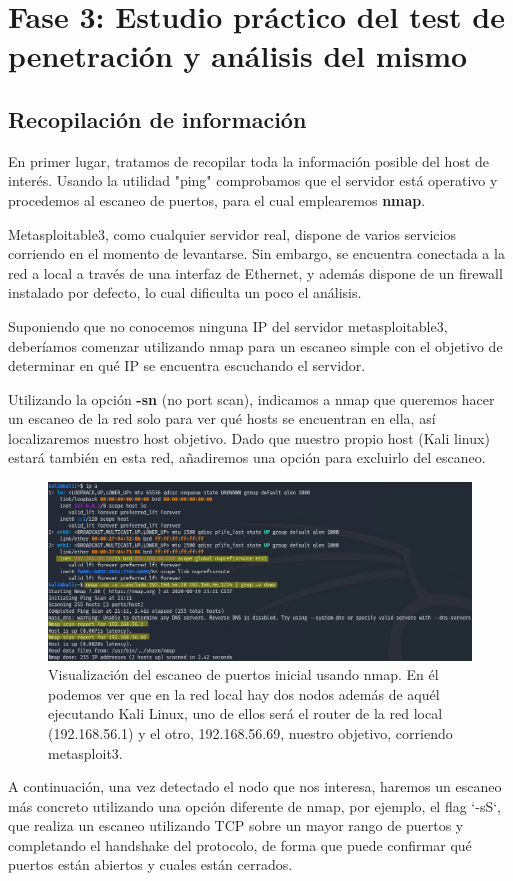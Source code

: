 \chapter{Fase 3: Estudio práctico del test de penetración y análisis del mismo}

\section{Recopilación de información}

En primer lugar, tratamos de recopilar toda la información posible del host de interés. Usando la utilidad "ping" comprobamos que el servidor está operativo y procedemos al escaneo de puertos, para el cual emplearemos \textbf{nmap}.

Metasploitable3, como cualquier servidor real, dispone de varios servicios corriendo en el momento de levantarse. Sin embargo, se encuentra conectada a la red a local a través de una interfaz de Ethernet, y además dispone de un firewall instalado por defecto, lo cual dificulta un poco el análisis.

Suponiendo que no conocemos ninguna IP del servidor metasploitable3, deberíamos comenzar utilizando nmap para un escaneo simple con el objetivo de determinar en qué IP se encuentra escuchando el servidor.

Utilizando la opción \textbf{-sn} (no port scan), indicamos a nmap que queremos hacer un escaneo de la red solo para ver qué hosts se encuentran en ella, así localizaremos nuestro host objetivo. Dado que nuestro propio host (Kali linux) estará también en esta red, añadiremos una opción para excluirlo del escaneo. 

\begin{figure}[hbt]
  \centering
      \includegraphics[width=\textwidth]{imagenes/nmap_sn.png}
  \caption{Visualización del escaneo de puertos inicial usando nmap. En él podemos ver que en la red local hay dos nodos además de aquél ejecutando Kali Linux, uno de ellos será el router de la red local (192.168.56.1) y el otro, 192.168.56.69, nuestro objetivo, corriendo metasploit3.}
\end{figure}

A continuación, una vez detectado el nodo que nos interesa, haremos un escaneo más concreto utilizando una opción diferente de nmap, por ejemplo, el flag `-sS`, que realiza un escaneo utilizando TCP sobre un mayor rango de puertos y completando el handshake del protocolo, de forma que puede confirmar qué puertos están abiertos y cuales están cerrados.

